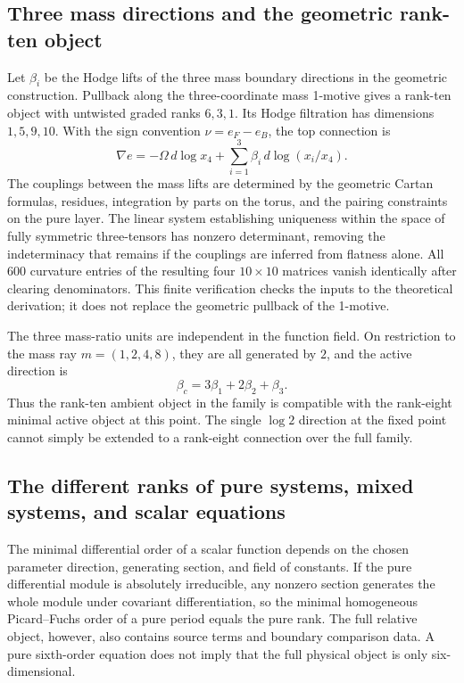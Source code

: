 \documentclass[11pt,a4paper,oneside]{article}
\theoremstyle{plain}
\theoremstyle{definition}
\theoremstyle{remark}
\numberwithin{equation}{section}
\begin{document}
\subsection{Three mass directions and the geometric rank-ten object}
Let $\beta_i$ be the Hodge lifts of the three mass boundary directions in the geometric construction. Pullback along the three-coordinate mass 1-motive gives a rank-ten object with untwisted graded ranks $6,3,1$. Its Hodge filtration has dimensions $1,5,9,10$. With the sign convention $\nu=e_F-e_B$, the top connection is
\begin{equation}
 \nabla e=-\Omega\,d\log x_4+
 \sum_{i=1}^3\beta_i\,d\log(x_i/x_4).
\end{equation}
The couplings between the mass lifts are determined by the geometric Cartan formulas, residues, integration by parts on the torus, and the pairing constraints on the pure layer. The linear system establishing uniqueness within the space of fully symmetric three-tensors has nonzero determinant, removing the indeterminacy that remains if the couplings are inferred from flatness alone. All $600$ curvature entries of the resulting four $10\times10$ matrices vanish identically after clearing denominators. This finite verification checks the inputs to the theoretical derivation; it does not replace the geometric pullback of the 1-motive.

The three mass-ratio units are independent in the function field. On restriction to the mass ray $m=(1,2,4,8)$, they are all generated by $2$, and the active direction is
\begin{equation}
 \beta_c=3\beta_1+2\beta_2+\beta_3.
\end{equation}
Thus the rank-ten ambient object in the family is compatible with the rank-eight minimal active object at this point. The single $\log2$ direction at the fixed point cannot simply be extended to a rank-eight connection over the full family.


\subsection{The different ranks of pure systems, mixed systems, and scalar equations}
The minimal differential order of a scalar function depends on the chosen parameter direction, generating section, and field of constants. If the pure differential module is absolutely irreducible, any nonzero section generates the whole module under covariant differentiation, so the minimal homogeneous Picard--Fuchs order of a pure period equals the pure rank. The full relative object, however, also contains source terms and boundary comparison data. A pure sixth-order equation does not imply that the full physical object is only six-dimensional.
\end{document}
